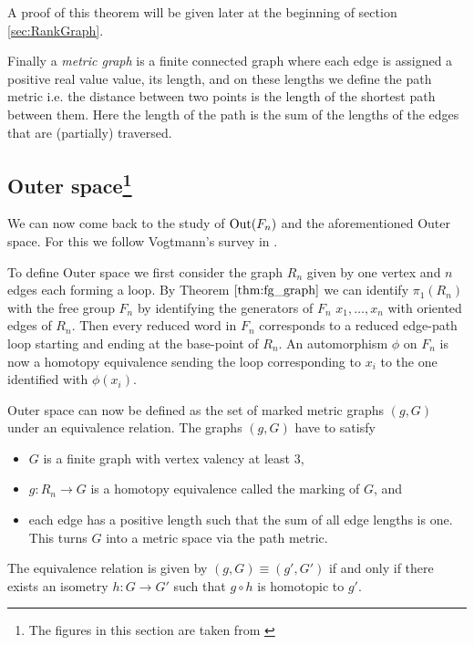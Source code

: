 A proof of this theorem will be given later at the beginning of section \ref{sec:RankGraph}.

Finally a \emph{metric graph} is a finite connected graph where each edge is assigned a positive real value 
value, its length, and on these lengths we define the path metric i.e.
the distance between two points is the length of the shortest path between them.
Here the length of the path is the sum of the lengths of the edges that are (partially) traversed.

\subsection{Outer space\footnote{The figures in this section are taken from \cite{vogtmann02}}}
We can now come back to the study of $\operatorname{Out}(F_{n})$ and the aforementioned Outer space. 
For this we follow Vogtmann's survey in \cite{vogtmann02}.

To define Outer space we first consider the graph $R_{n}$ given by one vertex and $n$ edges each forming a loop.
By Theorem $\ref{thm:fg_graph}$ we can identify $\pi_1(R_{n})$ with the free group $F_{n}$ by
identifying the generators of $F_{n}$ $x_1,\ldots,x_{n}$ with oriented edges of $R_{n}$.
Then every reduced word in $F_{n}$ corresponds to a reduced edge-path loop starting and ending at the base-point of $R_{n}$.
An automorphism $\phi$ on $F_{n}$ is now a homotopy equivalence sending the loop corresponding to $x_{i}$
to the one identified with $\phi(x_{i})$.

Outer space can now be defined as the set of marked metric graphs $(g,G)$ under an equivalence relation.
The graphs $(g,G)$ have to satisfy
\begin{itemize}
	\item $G$ is a finite graph with vertex valency at least $3$,
	\item $g: R_{n} \to G$ is a homotopy equivalence called the marking of $G$, and
	\item each edge has a positive length such that the sum of all
		edge lengths is one. This turns $G$ into a metric space via the path metric.
\end{itemize}
The equivalence relation is given by $(g,G) \equiv (g',G')$ if and only if 
there exists an isometry $h: G \to G'$ such that $g \circ h$ is homotopic to $g'$.

